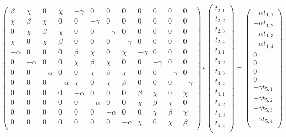 \documentclass[12pt]{article}
\newcommand{\Gpmatrix}[1]{\ensuremath{\begin{pmatrix} #1 \end{pmatrix}}}
\newcommand{\sub}[3]{\ensuremath{#1_{#2,#3}}}
\begin{document}
\(
\Gpmatrix{
  \beta & \chi & 0 & \chi & -\gamma & 0 & 0 & 0 & 0 & 0 & 0 & 0 \\
  \chi & \beta & \chi & 0 & 0 & -\gamma & 0 & 0 & 0 & 0 & 0 & 0 \\
  0 & \chi & \beta & \chi & 0 & 0 & -\gamma & 0 & 0 & 0 & 0 & 0 \\
  \chi & 0 & \chi & \beta & 0 & 0 & 0 & -\gamma & 0 & 0 & 0 & 0 \\
  -\alpha & 0 & 0 & 0 & \beta & \chi & 0 & \chi & -\gamma & 0 & 0 & 0 \\
  0 & -\alpha & 0 & 0 & \chi & \beta & \chi & 0 & 0 & -\gamma & 0 & 0 \\
  0 & 0 & -\alpha & 0 & 0 & \chi & \beta & \chi & 0 & 0 & -\gamma & 0 \\
  0 & 0 & 0 & -\alpha & \chi & 0 & \chi & \beta & 0 & 0 & 0 & -\gamma \\
  0 & 0 & 0 & 0 & -\alpha & 0 & 0 & 0 & \beta & \chi & 0 & \chi \\
  0 & 0 & 0 & 0 & 0 & -\alpha & 0 & 0 & \chi & \beta & \chi & 0 \\
  0 & 0 & 0 & 0 & 0 & 0 & -\alpha & 0 & 0 & \chi & \beta & \chi \\
  0 & 0 & 0 & 0 & 0 & 0 & 0 & -\alpha & \chi & 0 & \chi & \beta \\
} \cdot \Gpmatrix{
  \sub{t}{2}{1} \\
  \sub{t}{2}{2} \\
  \sub{t}{2}{3} \\
  \sub{t}{2}{4} \\
  \sub{t}{3}{1} \\
  \sub{t}{3}{2} \\
  \sub{t}{3}{3} \\
  \sub{t}{3}{4} \\
  \sub{t}{4}{1} \\
  \sub{t}{4}{2} \\
  \sub{t}{4}{3} \\
  \sub{t}{4}{4} \\
} = \Gpmatrix{
  -\alpha\sub{t}{1}{1} \\
  -\alpha\sub{t}{1}{2} \\
  -\alpha\sub{t}{1}{3} \\
  -\alpha\sub{t}{1}{4} \\
  0 \\
  0 \\
  0 \\
  0 \\
  -\gamma\sub{t}{5}{1} \\
  -\gamma\sub{t}{5}{2} \\
  -\gamma\sub{t}{5}{3} \\
  -\gamma\sub{t}{5}{4} \\
}
\)
\end{document}
